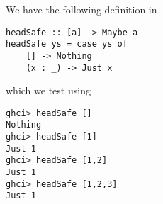 
We have the following definition in 
\scriptsize\begin{verbatim}
headSafe :: [a] -> Maybe a
headSafe ys = case ys of
    [] -> Nothing
    (x : _) -> Just x
\end{verbatim}\normalsize
which we test using
\scriptsize\begin{verbatim}
ghci> headSafe []
Nothing
ghci> headSafe [1]
Just 1
ghci> headSafe [1,2]
Just 1
ghci> headSafe [1,2,3]
Just 1
\end{verbatim}\normalsize
